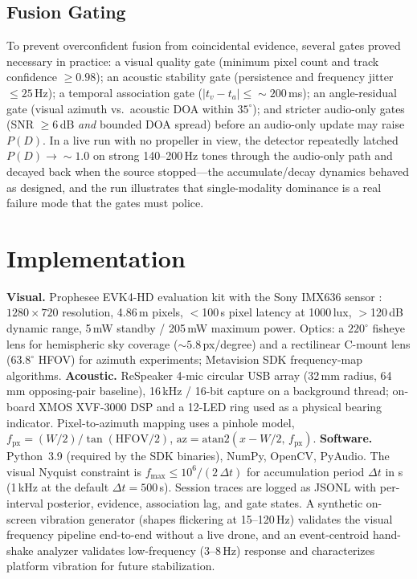 \documentclass[conference]{IEEEtran}
\begin{document}
\subsection{Fusion Gating}
To prevent overconfident fusion from coincidental evidence, several gates
proved necessary in practice: a visual quality gate (minimum pixel count
and track confidence $\ge 0.98$); an acoustic stability gate (persistence
and frequency jitter $\le 25$\,Hz); a temporal association gate
($|t_v - t_a| \le {\sim}200$\,ms); an angle-residual gate (visual azimuth
vs.\ acoustic DOA within $35^{\circ}$); and stricter audio-only gates
(SNR $\ge 6$\,dB \emph{and} bounded DOA spread) before an audio-only
update may raise $P(D)$. In a live run with no propeller in view, the
detector repeatedly latched $P(D) \to {\sim}1.0$ on strong 140--200\,Hz
tones through the audio-only path and decayed back when the source
stopped---the accumulate/decay dynamics behaved as designed, and the run
illustrates that single-modality dominance is a real failure mode that
the gates must police.

\section{Implementation}
\textbf{Visual.} Prophesee EVK4-HD evaluation kit with the Sony IMX636
sensor \cite{finateu2020}: $1280\times720$ resolution, 4.86\,\textmu m
pixels, $<$100\,\textmu s pixel latency at 1000\,lux, $>$120\,dB dynamic
range, 5\,mW standby / 205\,mW maximum power. Optics: a $220^{\circ}$
fisheye lens for hemispheric sky coverage (${\sim}5.8$\,px/degree) and a
rectilinear C-mount lens ($63.8^{\circ}$ HFOV) for azimuth experiments;
Metavision SDK frequency-map algorithms.
\textbf{Acoustic.} ReSpeaker 4-mic circular USB array (32\,mm radius,
64\,mm opposing-pair baseline), 16\,kHz / 16-bit capture on a background
thread; on-board XMOS XVF-3000 DSP and a 12-LED ring used as a physical
bearing indicator. Pixel-to-azimuth mapping uses a pinhole model,
$f_{\mathrm{px}} = (W/2)/\tan(\mathrm{HFOV}/2)$,
$\mathrm{az} = \mathrm{atan2}(x - W/2,\, f_{\mathrm{px}})$.
\textbf{Software.} Python~3.9 (required by the SDK binaries), NumPy,
OpenCV, PyAudio. The visual Nyquist constraint is
$f_{\max} \le 10^{6} / (2\,\Delta t)$ for accumulation period
$\Delta t$ in \textmu s (1\,kHz at the default
$\Delta t = 500$\,\textmu s). Session traces are logged as JSONL with
per-interval posterior, evidence, association lag, and gate states. A
synthetic on-screen vibration generator (shapes flickering at
15--120\,Hz) validates the visual frequency pipeline end-to-end without
a live drone, and an event-centroid hand-shake analyzer validates
low-frequency (3--8\,Hz) response and characterizes platform vibration
for future stabilization.
\end{document}
